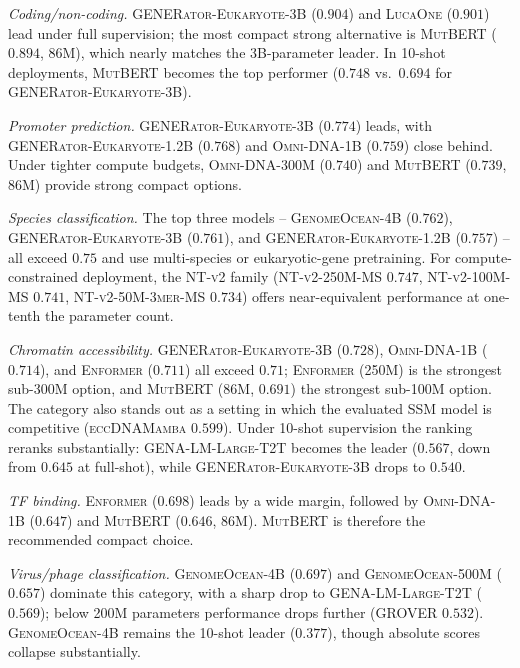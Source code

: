 \documentclass{article}
\theoremstyle{plain}
\theoremstyle{definition}
\theoremstyle{remark}
\begin{document}
\textit{Coding/non-coding.} \textsc{GENERator-Eukaryote-3B} ($0.904$)
and \textsc{LucaOne} ($0.901$) lead under full supervision; the most
compact strong alternative is \textsc{MutBERT} ($0.894$, 86M), which
nearly matches the 3B-parameter leader. In 10-shot deployments,
\textsc{MutBERT} becomes the top performer ($0.748$ vs.\ $0.694$ for
\textsc{GENERator-Eukaryote-3B}).

\textit{Promoter prediction.} \textsc{GENERator-Eukaryote-3B}
($0.774$) leads, with \textsc{GENERator-Eukaryote-1.2B} ($0.768$) and
\textsc{Omni-DNA-1B} ($0.759$) close behind. Under tighter compute
budgets, \textsc{Omni-DNA-300M} ($0.740$) and \textsc{MutBERT}
($0.739$, 86M) provide strong compact options.

\textit{Species classification.} The top three models -- %
\textsc{GenomeOcean-4B} ($0.762$), \textsc{GENERator-Eukaryote-3B}
($0.761$), and \textsc{GENERator-Eukaryote-1.2B} ($0.757$) -- all
exceed $0.75$ and use multi-species or eukaryotic-gene pretraining.
For compute-constrained deployment, the \textsc{NT-v2} family
(\textsc{NT-v2-250M-MS} $0.747$, \textsc{NT-v2-100M-MS} $0.741$,
\textsc{NT-v2-50M-3mer-MS} $0.734$) offers near-equivalent performance
at one-tenth the parameter count.

\textit{Chromatin accessibility.} \textsc{GENERator-Eukaryote-3B}
($0.728$), \textsc{Omni-DNA-1B} ($0.714$), and \textsc{Enformer}
($0.711$) all exceed $0.71$; \textsc{Enformer} (250M) is the strongest
sub-300M option, and \textsc{MutBERT} (86M, $0.691$) the strongest
sub-100M option. The category also stands out as a setting in which
the evaluated SSM model is competitive (\textsc{eccDNAMamba} $0.599$).
Under 10-shot supervision the ranking reranks substantially:
\textsc{GENA-LM-Large-T2T} becomes the leader ($0.567$, down from
$0.645$ at full-shot), while \textsc{GENERator-Eukaryote-3B} drops
to $0.540$.

\textit{TF binding.} \textsc{Enformer} ($0.698$) leads by a wide
margin, followed by \textsc{Omni-DNA-1B} ($0.647$) and \textsc{MutBERT}
($0.646$, 86M). \textsc{MutBERT} is therefore the recommended compact
choice.

\textit{Virus/phage classification.} \textsc{GenomeOcean-4B}
($0.697$) and \textsc{GenomeOcean-500M} ($0.657$) dominate this
category, with a sharp drop to \textsc{GENA-LM-Large-T2T}
($0.569$); below 200M parameters performance drops further
(\textsc{GROVER} $0.532$). \textsc{GenomeOcean-4B} remains the
10-shot leader ($0.377$), though absolute scores collapse
substantially.
\end{document}
